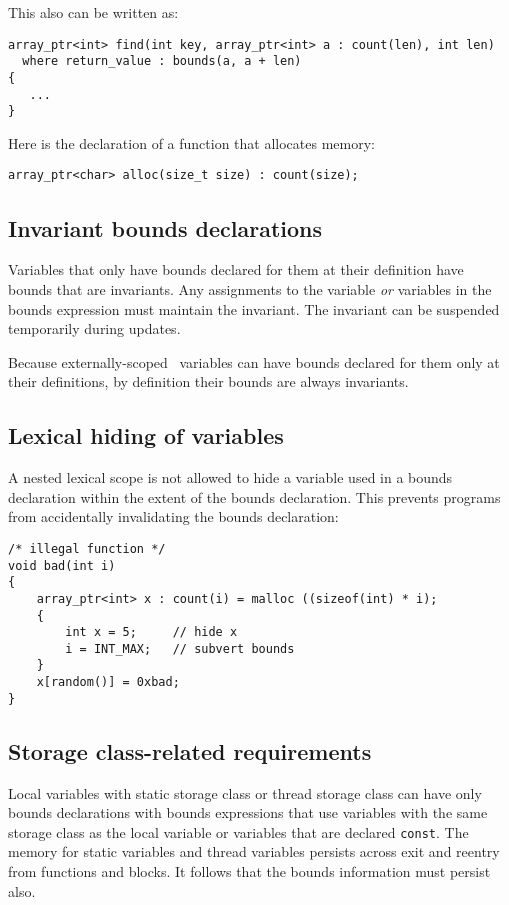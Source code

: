 This also can be written as:

\begin{verbatim}
array_ptr<int> find(int key, array_ptr<int> a : count(len), int len)
  where return_value : bounds(a, a + len)
{
   ...
}
\end{verbatim}
Here is the declaration of a function that allocates memory:

\begin{verbatim}
array_ptr<char> alloc(size_t size) : count(size);
\end{verbatim}

\subsection{Invariant bounds declarations}
\label{section:invariant-bounds-declarations}

Variables that only have bounds declared for them at their definition
have bounds that are invariants. Any assignments to the variable
\emph{or} variables in the bounds expression must maintain the
invariant. The invariant can be suspended temporarily during updates.

Because externally-scoped \arrayptr\ variables can have bounds declared
for them only at their definitions, by definition their bounds are
always invariants.

\subsection{Lexical hiding of variables}

A nested lexical scope is not allowed to hide a variable used in a
bounds declaration within the extent of the bounds declaration. This
prevents programs from accidentally invalidating the bounds declaration:

\begin{verbatim}
/* illegal function */
void bad(int i) 
{
    array_ptr<int> x : count(i) = malloc ((sizeof(int) * i);
    {
        int x = 5;     // hide x
        i = INT_MAX;   // subvert bounds
    }
    x[random()] = 0xbad;
}
\end{verbatim}

\subsection{Storage class-related requirements}

Local variables with static storage class or thread storage class can
have only bounds declarations with bounds expressions that use variables
with the same storage class as the local variable or variables that are declared
\texttt{const}. The memory for static variables and thread variables
persists across exit and reentry from functions and blocks. It follows
that the bounds information must persist also.

